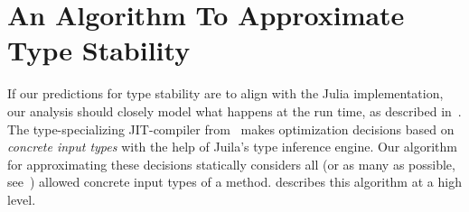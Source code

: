 \section{An Algorithm To Approximate Type Stability}%
\label{sec:algo}

If our predictions for type stability are to align with the Julia
implementation, our analysis should closely model what happens at the run time,
as described in~. The type-specializing JIT-compiler
from~ makes optimization decisions based on \emph{concrete
  input types} with the help of Juila's type inference engine. Our algorithm for
approximating these decisions statically considers all (or as many as possible,
see~) allowed concrete input types of a method.
 describes this algorithm at a high level.




